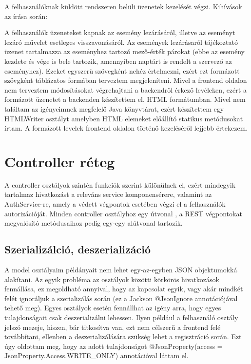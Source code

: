 \documentclass[a4paper,12pt]{report}
\theoremstyle{definition}
\theoremstyle{remark}
\begin{document}
A felhasználóknak küldött rendszeren belüli üzenetek kezelését végzi. Kihívások az írása során:

A felhasználók üzeneteket kapnak az esemény lezárásáról, illetve az eseményt lezáró művelet esetleges visszavonásáról. Az események lezárásaról tájékoztató üzenet tartalmazza az eseményhez tartozó mező-érték párokat (ebbe az esemény kezdete és vége is bele tartozik, amennyiben naptárt is rendelt a szervező az eseményhez). Ezeket egyszerű szövegként nehéz értelmezni, ezért ezt formázott szövgként táblázatos formában terveztem megjeleníteni. Mivel a frontend oldalon nem terveztem módosításokat végrehajtani a backendről érkező levéleken, ezért a formázott üzenetet a backenden készítettem el, HTML formátumban. Mivel nem találtam az igényeimnek megfelelő Java könyvtárat, ezért készítettem egy HTMLWriter osztályt amelyben HTML elemeket előállító statikus metódusokat írtam. A formázott levelek frontend oldalon történő kezeléséről lejjebb értekezem.

\section{Controller réteg}

A controller osztályok szintén funkciók szerint különülnek el, ezért mindegyik tartalmaz hivatkozást a releváns service komponensérere, valamint az AuthService-re, amely a védett végpontok esetében végzi el a felhasználók autorizációját. Minden controller osztályhoz egy útvonal , a REST végpontokat megvalósító metódusaihoz pedig egy-egy alútvonal tartozik.

\subsection{Szerializálció, deszerializáció}

A model osztályaim példányait nem lehet egy-az-egyben JSON objektumokká alakítani. Az egyik probléma az osztályok közötti körkörös hivatkozások fennállása, ez megoldható annyival, hogy az kapcsolat egyik, vagy akár mindkét felét ignoráljuk a szerializálás során (ez a Jackson @JsonIgnore annotációjával tehető meg). Egyes osztályok esetén fennállhat az igény arra, hogy egyes tulajdonságait csak deszerializálni lehessen. Ilyen például a felhasználó osztály jelszó mezeje, hiszen, bár titkosítva van, ezt nem célszerű a frontend felé továbbítani, ellenben a deszerializálására szükség lehet a regisztráció során. Ezt úgy oldottam meg, hogy az adott tulajdonságot @JsonProperty(access = JsonProperty.Access.WRITE\_ONLY) annotációval láttam el.
\end{document}
